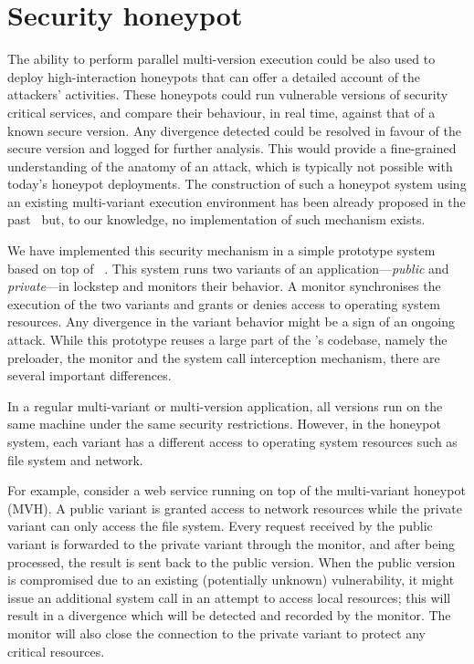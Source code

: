 \section{Security honeypot}
\label{sec:honeypot}

The ability to perform parallel multi-version execution could be also used to
deploy high-interaction honeypots that can offer a detailed account of the
attackers' activities. These honeypots could run vulnerable versions of
security critical services, and compare their behaviour, in real time, against
that of a known secure version.  Any divergence detected could be resolved in
favour of the secure version and logged for further analysis.  This would
provide a fine-grained understanding of the anatomy of an attack, which is
typically not possible with today's honeypot deployments. The construction
of such a honeypot system using an existing multi-variant execution
environment has been already proposed in the past~\cite{jackson10} but,
to our knowledge, no implementation of such mechanism exists.

We have implemented this security mechanism in a simple prototype system based
on top of \varan~\cite{pes:mvh}. This system runs two variants of an
application---\emph{public} and \emph{private}---in lockstep and monitors their
behavior. A monitor synchronises the execution of the two variants and grants
or denies access to operating system resources. Any divergence in the variant
behavior might be a sign of an ongoing attack. While this prototype reuses a
large part of the \varan's codebase, namely the preloader, the monitor and the
system call interception mechanism, there are several important differences.

In a regular multi-variant or multi-version application, all versions run on
the same machine under the same security restrictions.  However, in the
honeypot system, each variant has a different access to operating system
resources such as file system and network.

For example, consider a web service running on top of the multi-variant
honeypot (MVH). A public variant is granted access to network resources while
the private variant can only access the file system. Every request received by
the public variant is forwarded to the private variant through the monitor, and
after being processed, the result is sent back to the public version. When the
public version is compromised due to an existing (potentially unknown)
vulnerability, it might issue an additional system call in an attempt to
access local resources; this will result in a divergence which will be detected
and recorded by the monitor. The monitor will also close the connection to the
private variant to protect any critical resources.

